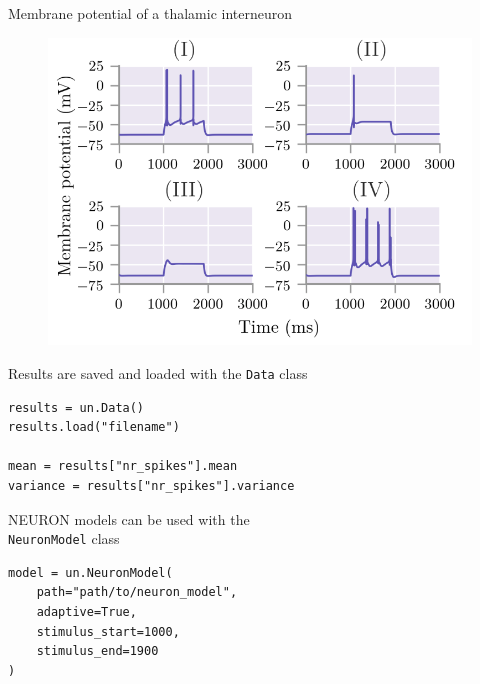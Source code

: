 \documentclass[presentation]{beamer}
\begin{document}
\begin{frame}{Membrane potential of a thalamic interneuron}
  \vspace{-5mm}

  \begin{figure}
      \includegraphics[width=1\textwidth]{lgn_results.png}
  \end{figure}

\end{frame}



\begin{frame}[fragile]{Results are saved and loaded with the \lstinline|Data| class}

\begin{lstlisting}
results = un.Data()
results.load("filename")

mean = results["nr_spikes"].mean
variance = results["nr_spikes"].variance
\end{lstlisting}
\end{frame}






\begin{frame}[fragile]{NEURON models can be used with the \\
                       \lstinline|NeuronModel| class}

  \begin{lstlisting}
model = un.NeuronModel(
    path="path/to/neuron_model",
    adaptive=True,
    stimulus_start=1000,
    stimulus_end=1900
)
  \end{lstlisting}
\end{frame}
\end{document}
